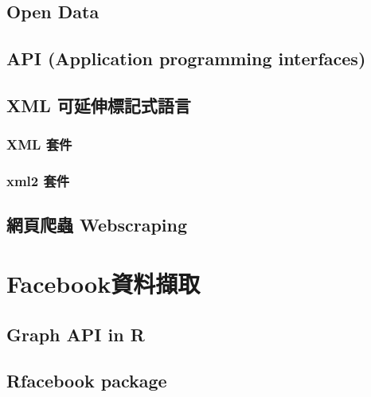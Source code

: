 \documentclass[
]{book}
\begin{document}
\hypertarget{open-data}{%
\subsection{Open Data}\label{open-data}}

\hypertarget{api}{%
\subsection{API (Application programming interfaces)}\label{api}}

\hypertarget{xml}{%
\subsection{XML 可延伸標記式語言}\label{xml}}

\hypertarget{xml-ux5957ux4ef6}{%
\subsubsection{XML 套件}\label{xml-ux5957ux4ef6}}

\hypertarget{xml2-ux5957ux4ef6}{%
\subsubsection{xml2 套件}\label{xml2-ux5957ux4ef6}}

\hypertarget{ux7db2ux9801ux722cux87f2-webscraping}{%
\subsection{網頁爬蟲 Webscraping}\label{ux7db2ux9801ux722cux87f2-webscraping}}

\hypertarget{facebookux8cc7ux6599ux64f7ux53d6}{%
\section{Facebook資料擷取}\label{facebookux8cc7ux6599ux64f7ux53d6}}

\hypertarget{graph-api-in-r}{%
\subsection{Graph API in R}\label{graph-api-in-r}}

\hypertarget{rfacebook-package}{%
\subsection{Rfacebook package}\label{rfacebook-package}}
\end{document}

